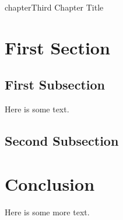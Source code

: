 chapter{Third Chapter Title}
\chaptoc %

\section{First Section}
\subsection{First Subsection}
Here is some text. 

\subsection{Second Subsection}

\section{Conclusion}
Here is some more text. 
